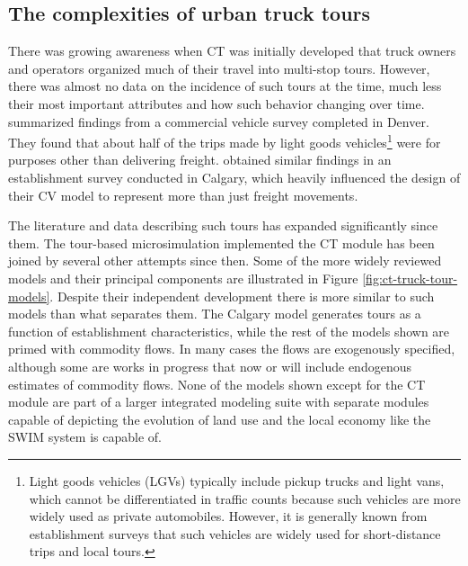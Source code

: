 \subsection{The complexities of urban truck tours}\label{sec:ct-tour-complexity}

There was growing awareness when CT was initially developed that truck owners and operators organized much of their travel into multi-stop tours. However, there was almost no data on the incidence of such tours at the time, much less their most important attributes and how such behavior changing over time. \cite{holguinveras05} summarized findings from a commercial vehicle survey completed in Denver. They found that about half of the trips made by light goods vehicles\footnote{Light goods vehicles (LGVs) typically include pickup trucks and light vans, which cannot be differentiated in traffic counts because such vehicles are more widely used as private automobiles. However, it is generally known from establishment surveys that such vehicles are widely used for short-distance trips and local tours.} were for purposes other than delivering freight. \cite{hunt06} obtained similar findings in an establishment survey conducted in Calgary, which heavily influenced the design of their CV model to represent more than just freight movements. 

The literature and data describing such tours has expanded significantly since them. The tour-based microsimulation implemented the CT module has been joined by several other attempts since then. Some of the more widely reviewed models and their principal components are illustrated in Figure \ref{fig:ct-truck-tour-models}. Despite their independent development there is more similar to such models than what separates them. The Calgary model \citep{hunt07} generates tours as a function of establishment characteristics, while the rest of the models shown are primed with commodity flows. In many cases the flows are exogenously specified, although some are works in progress that now or will include endogenous estimates of commodity flows. None of the models shown except for the CT module are part of a larger integrated modeling suite with separate modules capable of depicting the evolution of land use and the local economy like the SWIM system is capable of. 

